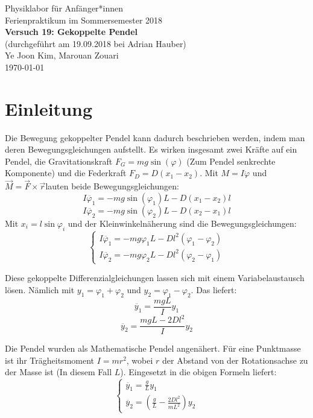 \documentclass[11pt,a4paper]{article}
\begin{document}
{
	\centering 
	\large 
	Physiklabor für Anfänger*innen \\
	Ferienpraktikum im Sommersemester 2018 \\[4mm]
	\textbf{\LARGE 
		Versuch 19: Gekoppelte Pendel
	} \\[3mm]
	(durchgeführt am 19.09.2018 bei Adrian Hauber) \\
	Ye Joon Kim, Marouan Zouari\\
	\today \\[10mm]
}
\tableofcontents
\newpage
\section{Einleitung}
Die Bewegung gekoppelter Pendel kann dadurch beschrieben werden, indem man deren Bewegungsgleichungen aufstellt. Es wirken insgesamt zwei Kräfte auf ein Pendel, die Gravitationskraft $F_G = mg\sin(\varphi)$ (Zum Pendel senkrechte Komponente) und die Federkraft $F_D = D(x_1 - x_2)$. Mit $M = I\ddot{\varphi}$ und $\vec{M} = \vec{F}\times \vec{r}$lauten beide Bewegungsgleichungen:
$$ I \ddot{\varphi_1} = -mg\sin(\varphi_1)L - D(x_1-x_2)l$$
$$I \ddot{\varphi_2} = -mg\sin(\varphi_2)L - D(x_2-x_1)l$$
Mit $x_i = l\sin{\varphi_i}$ und der Kleinwinkelnäherung sind die Bewegungsgleichungen:
\begin{equation}
\left\{
\begin{array}{c}
I\ddot{\varphi_1}=-mg\varphi_1L - Dl^2(\varphi_1-\varphi_2)
\\
I\ddot{\varphi_2}=-mg\varphi_2L - Dl^2(\varphi_2-\varphi_1)
\end{array}
\right.
\end{equation}

Diese gekoppelte Differenzialgleichungen lassen sich mit einem Variabelaustausch lösen. Nämlich mit $y_1 = \varphi_1 + \varphi_2$ und $y_2 = \varphi_1 - \varphi_2$. Das liefert:
$$\ddot{y_1} = \frac{mgL}{I}y_1$$
$$\ddot{y_2} = \frac{mgL-2Dl^2}{I}y_2$$

Die Pendel wurden als Mathematische Pendel angenähert. Für eine Punktmasse ist ihr Trägheitsmoment $I = mr^2$, wobei $r$ der Abstand von der Rotationsachse zu der Masse ist (In diesem Fall $L$). Eingesetzt in die obigen Formeln liefert:
\begin{equation}
\left\{
\begin{array}{c}
\ddot{y_1} = \frac{g}{L}y_1
\\
\ddot{y_2} = (\frac{g}{L}-\frac{2Dl^2}{mL^2})y_2
\end{array}
\right.
\end{equation}
\end{document}
